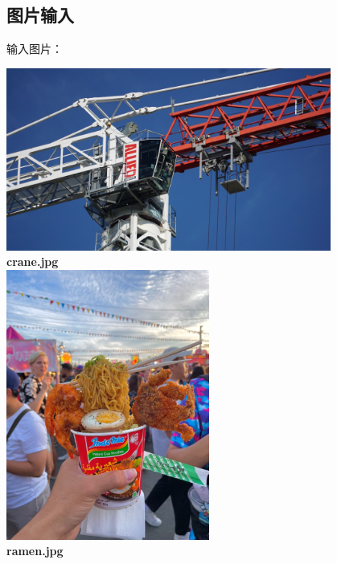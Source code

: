 \documentclass{article}
\begin{document}
\subsection{图片输入}
输入图片：\\
\begin{center}
    \includegraphics[width=0.8\textwidth]{../python/crane.jpg}\\
    \textbf{crane.jpg}\\
    \includegraphics[width=0.5\textwidth]{../python/ramen.jpg}\\
    \textbf{ramen.jpg}\\
\end{center}
\end{document}

